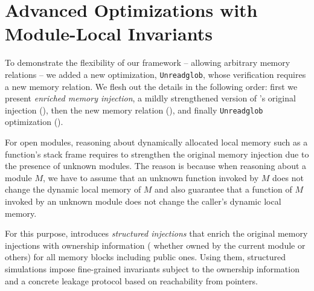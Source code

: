 \section{Advanced Optimizations with Module-Local Invariants}
\label{sec:compiler:advanced}

To demonstrate the flexibility of our framework -- allowing arbitrary memory relations -- we added a new optimization, \texttt{Unreadglob}, whose verification requires a new memory relation.
We flesh out the details in the following order: first we present {\it enriched memory injection}, a mildly strengthened version of \cc{}'s original injection (),
then the new memory relation (), and finally \texttt{Unreadglob} optimization ().


\label{sec:overview-verification:injection:dynamic}
%
For open modules, reasoning about dynamically allocated local memory
such as a function's stack frame requires to strengthen the original
memory injection due to the presence of unknown modules.  The reason
is because when reasoning about a module $M$, we have to assume that
an unknown function invoked by $M$ does not change the dynamic local
memory of $M$ and also guarantee that a function of $M$ invoked by an
unknown module does not change the caller's dynamic local memory.

For this purpose, \ccc{} introduces \emph{structured injections} that
enrich the original memory injections with ownership information (\ie
whether owned by the current module or others) for all memory blocks
including public ones.  Using them, structured simulations impose
fine-grained invariants subject to the ownership information and a
concrete leakage protocol based on reachability from pointers.

